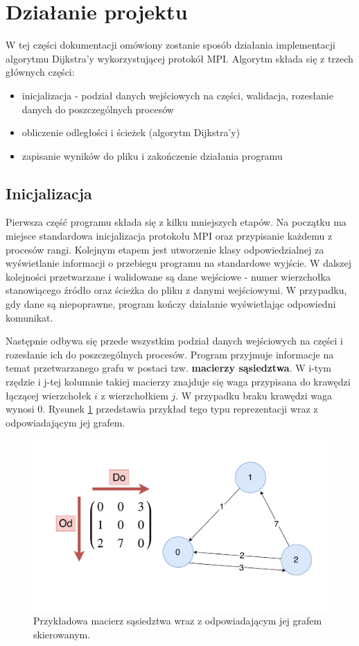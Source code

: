 \documentclass[12pt]{article}
\begin{document}
\newpage
\section{Działanie projektu}
W tej części dokumentacji omówiony zostanie sposób działania implementacji algorytmu Dijkstra'y wykorzystującej protokół MPI. Algorytm składa się z trzech głównych części:
\begin{itemize}
\item inicjalizacja - podział danych wejściowych na części, walidacja, rozesłanie danych do poszczególnych procesów
\item obliczenie odległości i ścieżek (algorytm Dijkstra'y)
\item zapisanie wyników do pliku i zakończenie działania programu
\end{itemize}


\subsection{Inicjalizacja}
Pierwsza część programu składa się z kilku mniejszych etapów. Na początku ma miejsce standardowa inicjalizacja protokołu MPI oraz przypisanie każdemu z procesów rangi. Kolejnym etapem jest utworzenie klasy odpowiedzialnej za wyświetlanie informacji o przebiegu programu na standardowe wyjście. W dalszej kolejności przetwarzane i walidowane są dane wejściowe - numer wierzchołka stanowiącego źródło oraz ścieżka do pliku z danymi wejściowymi. W przypadku, gdy dane są niepoprawne, program kończy działanie wyświetlając odpowiedni komunikat.

Następnie odbywa się przede wszystkim podział danych wejściowych na części i rozesłanie ich do poszczególnych procesów. Program przyjmuje informacje na temat przetwarzanego grafu w postaci tzw. \textbf{macierzy sąsiedztwa}. W i-tym rzędzie i j-tej kolumnie takiej macierzy znajduje się waga przypisana do krawędzi łączącej wierzchołek $i$ z wierzchołkiem $j$. W przypadku braku krawędzi waga wynosi 0. Rysunek \ref{fig:am1} przedstawia przykład tego typu reprezentacji wraz z odpowiadającym jej grafem.

\begin{figure}[H]
\centering
\includegraphics[width=\textwidth]{static/AdjacencyMatrixExample.pdf}
\caption{Przykładowa macierz sąsiedztwa wraz z odpowiadającym jej grafem skierowanym.}
\label{fig:am1}
\end{figure}
\end{document}
